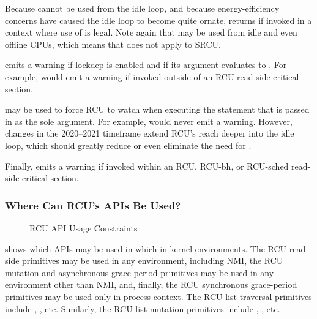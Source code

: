 \QuickQuizEnd

Because  cannot be used from the idle loop,
and because energy-efficiency concerns have caused the idle loop
to become quite ornate,  returns  if
invoked in a context where use of  is legal.
Note again that  may be used from idle and
even offline CPUs, which means that  does not
apply to SRCU\@.

 emits a warning if lockdep is enabled and if
its argument evaluates to .
For example,  would emit a
warning if invoked outside of an RCU read-side critical section.

 may be used to force RCU to watch when executing
the statement that is passed in as the sole argument.
For example, 
would never emit a warning.
However, changes in the 2020--2021 timeframe extend RCU's reach deeper
into the idle loop, which should greatly reduce or even eliminate the
need for .

Finally,   emits a warning if invoked within
an RCU, RCU-bh, or RCU-sched read-side critical section.

\subsubsection{Where Can RCU's APIs Be Used?}
\label{sec:defer:Where Can RCU's APIs Be Used?}

\begin{figure}
\centering
{}
\caption{RCU API Usage Constraints}
\label{fig:defer:RCU API Usage Constraints}
\end{figure}

shows which APIs may be used in which in-kernel environments.
The RCU read-side primitives may be used in any environment, including NMI,
the RCU mutation and asynchronous grace-period primitives may be used in any
environment other than NMI, and, finally, the RCU synchronous grace-period
primitives may be used only in process context.
The RCU list-traversal primitives include ,
, etc.
Similarly, the RCU list-mutation primitives include
, , etc.

